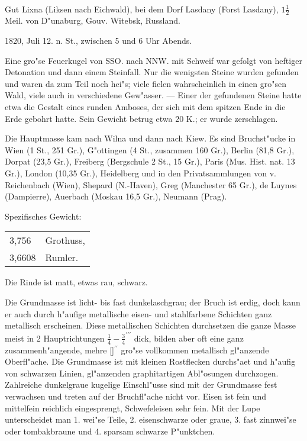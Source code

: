 \documentclass[a4paper, 11pt, oneside]{article}
\begin{document}
\paragraph{}
Gut Lixna (Liksen nach Eichwald), bei dem Dorf Lasdany (Forst Lasdany), $\mathfrak{1\frac{1}{2}}$ Meil. von D"unaburg, Gouv. Witebsk, Russland.

1820, Juli 12. n. St., zwischen 5 und 6 Uhr Abends.

Eine gro"se Feuerkugel von SSO. nach NNW. mit Schweif war gefolgt von heftiger Detonation und dann einem Steinfall. Nur die wenigsten Steine wurden gefunden und waren da zum Teil noch hei"s; viele fielen wahrscheinlich in einen gro"sen Wald, viele auch in verschiedene Gew"asser. --- Einer der gefundenen Steine hatte etwa die Gestalt eines runden Amboses, der sich mit dem spitzen Ende in die Erde gebohrt hatte. Sein Gewicht betrug etwa 20 K.; er wurde zerschlagen.

Die Hauptmasse kam nach Wilna und dann nach Kiew. Es sind Bruchst"ucke in Wien (1 St., 251 Gr.), G"ottingen (4 St., zusammen 160 Gr.), Berlin (81,8 Gr.), Dorpat (23,5 Gr.), Freiberg (Bergschule 2 St., 15 Gr.), Paris (Mus. Hist. nat. 13 Gr.), London (10,35 Gr.), Heidelberg und in den Privatsammlungen von v. Reichenbach (Wien), Shepard (N.-Haven), Greg (Manchester 65 Gr.), de Luynes (Dampierre), Auerbach (Moskau 16,5 Gr.), Neumann (Prag).

Spezifisches Gewicht:
\begin{table}[!ht]
    \centering\swabfamily\Large
    \begin{tabular}{l l}
        3,756 & Grothuss,\\
        3,6608 & Rumler.
    \end{tabular}
\end{table}

Die Rinde ist matt, etwas rau, schwarz.

Die Grundmasse ist licht- bis fast dunkelaschgrau; der Bruch ist erdig, doch kann er auch durch h"aufige metallische eisen- und stahlfarbene Schichten ganz metallisch erscheinen. Diese metallischen Schichten durchsetzen die ganze Masse meist in 2 Hauptrichtungen $\mathfrak{\frac{1}{4}-\frac{3}{4}^{\prime\prime\prime}}$ dick, bilden aber oft eine ganz zusammenh"angende, mehre []$^{\prime\prime}$ gro"se vollkommen metallisch gl"anzende Oberfl"ache. Die Grundmasse ist mit kleinen Rostflecken durchs"aet und h"aufig von schwarzen Linien, gl"anzenden graphitartigen Abl"osungen durchzogen. Zahlreiche dunkelgraue kugelige Einschl"usse sind mit der Grundmasse fest verwachsen und treten auf der Bruchfl"ache nicht vor. Eisen ist fein und mittelfein reichlich eingesprengt, Schwefeleisen sehr fein. Mit der Lupe unterscheidet man 1. wei"se Teile, 2. eisenschwarze oder graue, 3. fast zinnwei"se oder tombakbraune und 4. sparsam schwarze P"unktchen.
\end{document}
